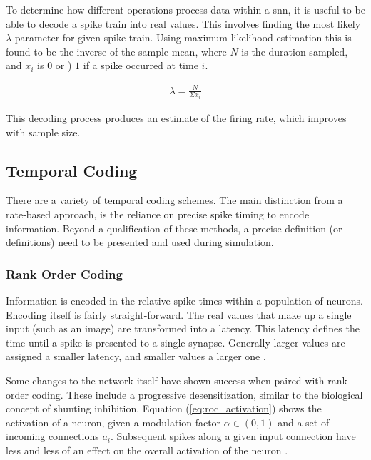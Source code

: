     
    
    To determine how different operations process data within a \Gls{snn}, it is
    useful to be able to decode a spike train into real values. This involves
    finding the most likely $\lambda$ parameter for given spike train. Using
    maximum likelihood estimation this is found to be the inverse of the sample
    mean, where $N$ is the duration sampled, and $x_i$ is $0$ or ) $1$ if a
    spike occurred at time $i$.
    
    \begin{align}
        \lambda = \frac{N}{\Sigma x_i}
    \end{align}
    
    This decoding process produces an estimate of the firing rate, which
    improves with sample size.
    
    \subsection{Temporal Coding}
    There are a variety of temporal coding schemes. The main distinction from a
    rate-based approach, is the reliance on precise spike timing to encode
    information. Beyond a qualification of these methods, a precise definition
    (or definitions) need to be presented and used during simulation.
    
    \subsubsection{Rank Order Coding}
    Information is encoded in the relative spike times within a population of
    neurons. Encoding itself is fairly straight-forward. The real values that
    make up a single input (such as an image) are transformed into a
    latency. This latency defines the time until a spike is presented to a
    single synapse. Generally larger values are assigned a smaller latency, and
    smaller values a larger one \parencite{delorme_2001}.
    
    Some changes to the network itself have shown success when paired with rank
    order coding. These include a progressive desensitization, similar to the
    biological concept of shunting inhibition. Equation (\ref{eq:roc_activation})
    shows the activation of a neuron, given a modulation factor
    $\alpha \in (0,1)$ and a set of incoming connections $a_i$. Subsequent spikes along a
    given input connection have less and less of an effect on the overall
    activation of the neuron \parencite{delorme_2001}.
    
